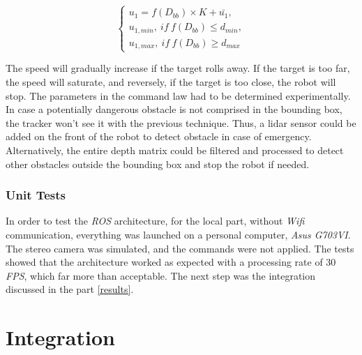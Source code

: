 		
		\begin{equation}\label{eq:math}
		\begin{cases}
		u_1 = f(D_{bb})\times K + \bar{u_1},\\
		u_{1,min},\ if\ f(D_{bb}) \leq d_{min},\\
		u_{1,max},\ if\ f(D_{bb}) \geq d_{max}		
		\end{cases}
		\end{equation}
				
		The speed will gradually increase if the target rolls away.
		If the target is too far, the speed will saturate, and reversely, 
		if the target is too close, the robot will stop. 
		The parameters in the command law had to be determined
		experimentally.
		\\\indent In case a potentially dangerous obstacle is not comprised in the 
		bounding box, the tracker won't see it with the previous technique. Thus, a lidar sensor
		could be added on the front of the robot to detect obstacle in case of emergency.
		Alternatively, the entire depth matrix could be filtered and processed to detect
		other obstacles outside the bounding box and stop the robot if needed.
		
		\subsection{Unit Tests}\label{hardwaretests}
		
		In order to test the \textit{ROS} architecture, 
		for the local part, without \textit{Wifi} communication,
		everything was launched on a personal computer, \textit{Asus G703VI}.
		The stereo camera was simulated, and the commands were not 
		applied. The tests showed that the architecture
		worked as expected with a processing rate of 30 \textit{FPS},
		which far more than acceptable. The next step was the integration discussed
		in the part \vref{results}.
			
\chapter{Integration}\label{results}
	
